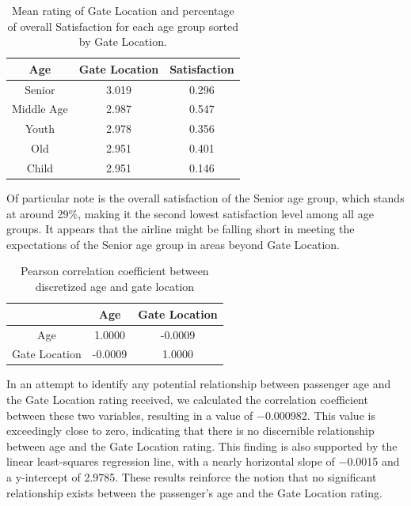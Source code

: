 \documentclass[11pt]{article}
\begin{document}
\begin{table}[!h]
    \centering
    \begin{tabular}{|c|c|c|}
        \hline
        Age & Gate Location  & Satisfaction \\
        \hline
    Senior  &     3.019        & 0.296 \\
        \hline
Middle Age  &     2.987        & 0.547 \\
        \hline
     Youth  &     2.978        & 0.356 \\
        \hline
    Old  &     2.951        & 0.401 \\
        \hline
    Child  &     2.951        & 0.146 \\
        \hline
    \end{tabular}
    \caption{\centering Mean rating of Gate Location and percentage of overall Satisfaction for each age group sorted by Gate Location.}
    \label{tab:7-2-1}
\end{table}

Of particular note is the overall satisfaction of the Senior age group, which stands at around 29\%, making it the second lowest satisfaction level among all age groups. It appears that the airline might be falling short in meeting the expectations of the Senior age group in areas beyond Gate Location.

\begin{table}[!h]
    \centering
    \begin{tabular}{|c|c|c|}
        \hline
                            &   Age     &   Gate Location   \\
        \hline
            Age     &   1.0000        &     -0.0009     \\
        \hline
            Gate Location   &   -0.0009       &    1.0000   \\
        \hline
    \end{tabular}
    \caption{\centering Pearson correlation coefficient between discretized age and gate location}
    \label{tab:7-2-2}
\end{table}

In an attempt to identify any potential relationship between passenger age and the Gate Location rating received, we calculated the correlation coefficient between these two variables, resulting in a value of \num{-0.000982}. This value is exceedingly close to zero, indicating that there is no discernible relationship between age and the Gate Location rating. This finding is also supported by the linear least-squares regression line, with a nearly horizontal slope of \num{-0.0015} and a y-intercept of \num{2.9785}. These results reinforce the notion that no significant relationship exists between the passenger's age and the Gate Location rating.
\end{document}
